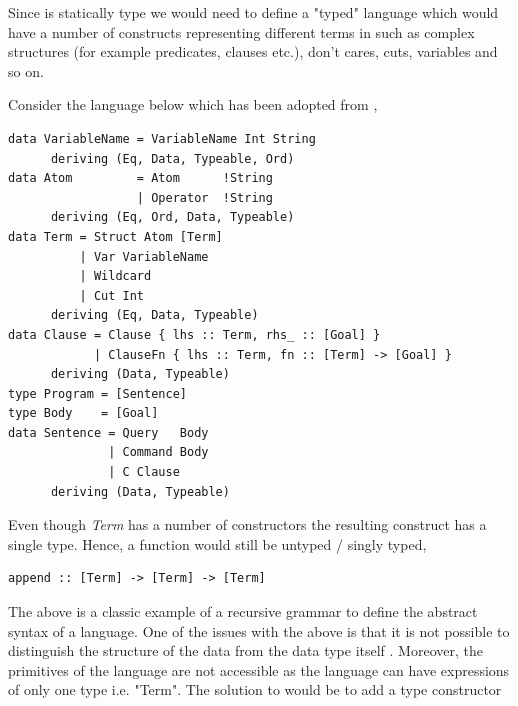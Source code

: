 \documentclass[thesis-solanki.tex]{subfiles}
\begin{document}
Since  is statically type we would need to define a "typed" language which would have a number of constructs representing 
different terms in  such as complex structures (for example predicates, clauses etc.), don't cares, cuts, variables and so 
on.

Consider the language below which has been adopted from \cite{prolog-lib},

\begin{verbatim}	
data VariableName = VariableName Int String
      deriving (Eq, Data, Typeable, Ord)
data Atom         = Atom      !String
                  | Operator  !String
      deriving (Eq, Ord, Data, Typeable)
data Term = Struct Atom [Term]
          | Var VariableName
          | Wildcard
          | Cut Int
      deriving (Eq, Data, Typeable)
data Clause = Clause { lhs :: Term, rhs_ :: [Goal] }
            | ClauseFn { lhs :: Term, fn :: [Term] -> [Goal] }
      deriving (Data, Typeable)
type Program = [Sentence]
type Body    = [Goal]
data Sentence = Query   Body
              | Command Body
              | C Clause
      deriving (Data, Typeable)
\end{verbatim}

Even though \textit{Term} has a number of constructors the resulting construct has a single type. Hence, a function would still be untyped 
/ singly typed,
\begin{verbatim}
append :: [Term] -> [Term] -> [Term]
\end{verbatim} 

The above is a classic example of a recursive grammar to define the abstract syntax of a language. One of the issues with the above is that 
it is not possible to distinguish the structure of the data from the data type itself \cite{sheard2004two}. Moreover, the primitives of the
language are not accessible as the language can have expressions of only one type i.e. "Term". The solution to would be to add a type 
constructor  

\end{document}
